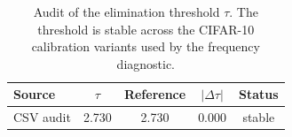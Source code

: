 \begin{table}[t]
\caption{Audit of the elimination threshold \(\tau\). The threshold is stable across the CIFAR-10 calibration variants used by the frequency diagnostic.}
\label{tab:tau-audit}
\centering
\scriptsize
\begin{tabular}{lcccc}
\hline
Source & \(\tau\) & Reference & \(|\Delta\tau|\) & Status \\
\hline
CSV audit & 2.730 & 2.730 & 0.000 & stable \\
\hline
\end{tabular}
\end{table}
